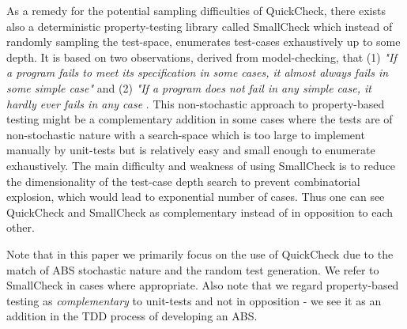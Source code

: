 As a remedy for the potential sampling difficulties of QuickCheck, there exists also a deterministic property-testing library called SmallCheck \cite{runciman_smallcheck_2008} which instead of randomly sampling the test-space, enumerates test-cases exhaustively up to some depth. It is based on two observations, derived from model-checking, that (1) \textit{"If a program fails to meet its specification in some cases, it almost always fails in some simple case"} and (2) \textit{"If a program does not fail in any simple case, it hardly ever fails in any case} \cite{runciman_smallcheck_2008}. This non-stochastic approach to property-based testing might be a complementary addition in some cases where the tests are of non-stochastic nature with a search-space which is too large to implement manually by unit-tests but is relatively easy and small enough to enumerate exhaustively. The main difficulty and weakness of using SmallCheck is to reduce the dimensionality of the test-case depth search to prevent combinatorial explosion, which would lead to exponential number of cases. Thus one can see QuickCheck and SmallCheck as complementary instead of in opposition to each other.

Note that in this paper we primarily focus on the use of QuickCheck due to the match of ABS stochastic nature and the random test generation. We refer to SmallCheck in cases where appropriate. Also note that we regard property-based testing as \textit{complementary} to unit-tests and not in opposition - we see it as an addition in the TDD process of developing an ABS.